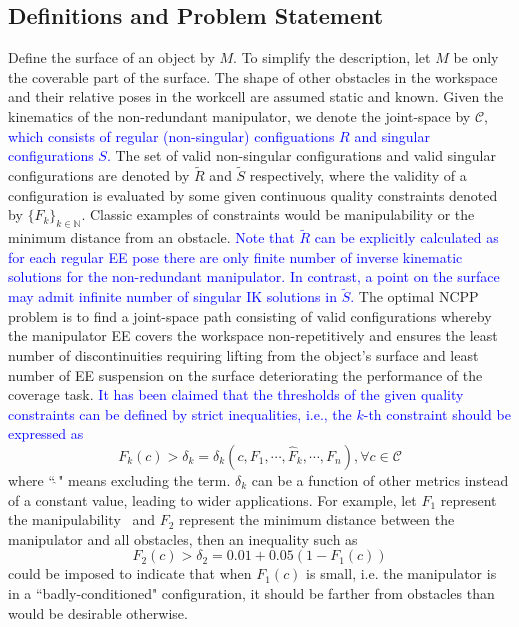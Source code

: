\documentclass[Afour,sageh,times]{sagej}
\begin{document}
\subsection{Definitions and Problem Statement}\label{subsection_definitions}
Define the surface of an object by $M$. 
To simplify the description, let $M$ be only the coverable part of the surface. 
The shape of other obstacles in the workspace and their relative poses in the workcell are assumed static and known.
Given the kinematics of the non-redundant manipulator, we denote the joint-space by $\mathscr{C}$, \textcolor{blue}{which consists of regular (non-singular) configuations $R$ and singular configurations $S$. }
The set of valid non-singular configurations and valid singular configurations are denoted by $\tilde{R}$ and $\tilde{S}$ respectively, where the validity of a configuration is evaluated by some given continuous quality constraints denoted by $\{F_k\}_{k\in \mathbb{N}}$. 
Classic examples of constraints would be manipulability or the minimum distance from an obstacle. 
\textcolor{blue}{Note that $\tilde{R}$ can be explicitly calculated as for each regular EE pose there are only finite number of inverse kinematic solutions for the non-redundant manipulator. In contrast, a point on the surface may admit infinite number of singular IK solutions in $\tilde{S}$. }
The optimal NCPP problem is to find a joint-space path consisting of valid configurations whereby the manipulator EE covers the workspace non-repetitively 
and ensures the least number of discontinuities requiring lifting from the object's surface and least number of EE suspension on the surface deteriorating the performance of the coverage task. 
\textcolor{blue}{
It has been claimed that the thresholds of the given quality constraints can be defined by strict inequalities, i.e., the $k$-th constraint should be expressed as
}
\begin{equation}\label{equ_strict}
F_k(c) > \delta_k = \delta_k(c, F_1, \cdots, \hat{F}_k, \cdots, F_{n}), \forall c\in \mathscr{C}
\end{equation} 
where ``$\hat{\ }$" means excluding the term. $\delta_k$ can be a function of other metrics instead of a constant value, leading to wider applications. 
For example, let $F_1$ represent the manipulability~\cite{yoshikawa1990translational} 
and $F_2$ represent the minimum distance between the manipulator and all obstacles, then an inequality such as
\begin{equation}
F_2(c) > \delta_2 = 0.01+0.05(1-F_1(c))
\end{equation}
could be imposed to indicate that when $F_1(c)$ is small, i.e. the manipulator is in a ``badly-conditioned" configuration, it should be farther from obstacles than would be desirable otherwise. 
\end{document}
